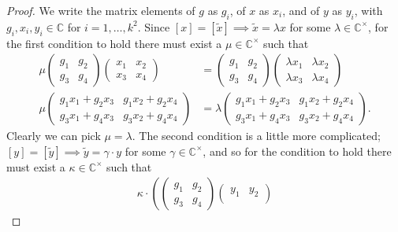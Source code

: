 \documentclass{amsart}
\newcommand{\C}{\mathbb{C}}
\theoremstyle{definition}
\theoremstyle{remark}
\numberwithin{equation}{section}
\begin{document}
\begin{proof}
    We write the matrix elements of $g$ as $g_i$, of $x$ as $x_i$, and of $y$ as $y_i$, with $g_i,x_i,y_i\in\C$ for $i=1,\ldots,k^2$.
    Since $[x]=[\tilde x]\implies \tilde x=\lambda x$ for some $\lambda\in\C^\times$, for the first condition to hold there must exist a $\mu\in\C^\times$ such that
    \begin{align*}
        \mu
        \begin{pmatrix}
            g_1 & g_2\\
            g_3 & g_4
        \end{pmatrix}
        \begin{pmatrix}
            x_1 & x_2\\
            x_3 & x_4
        \end{pmatrix}
        &=
        \begin{pmatrix}
            g_1 & g_2\\
            g_3 & g_4
        \end{pmatrix}
        \begin{pmatrix}
            \lambda x_1 & \lambda x_2\\
            \lambda x_3 & \lambda x_4
        \end{pmatrix}
        \nonumber \\
        \mu
        \begin{pmatrix}
            g_1x_1+g_2x_3 & g_1x_2+g_2x_4\\
            g_3x_1+g_4x_3 & g_3x_2+g_4x_4
        \end{pmatrix}
        &=
        \lambda
        \begin{pmatrix}
            g_1x_1+g_2x_3 & g_1x_2+g_2x_4\\
            g_3x_1+g_4x_3 & g_3x_2+g_4x_4
        \end{pmatrix}.
    \end{align*}
    Clearly we can pick $\mu=\lambda$.
    The second condition is a little more complicated; $[y]=[\tilde y]\implies \tilde y=\gamma\cdot y$ for some $\gamma\in\C^\times$, and so for the condition to hold
    there must exist a $\kappa\in\C^\times$ such that
    \begin{align*}
        \kappa\cdot
        \left(
        \begin{pmatrix}
            g_1 & g_2\\
            g_3 & g_4
        \end{pmatrix}
        \begin{pmatrix}
            y_1 & y_2\\

\end{pmatrix}
\end{align*}
\end{proof}
\end{document}
